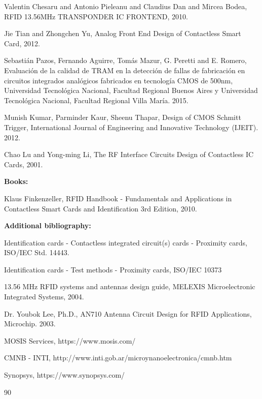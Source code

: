 \documentclass{article} %
\begin{document}
\begin{multicols}{2}
{\begin{thebibliography}{99}
	Valentin Chesaru and Antonio Pieleanu and Claudius Dan and Mircea Bodea, RFID 13.56MHz TRANSPONDER IC FRONTEND, 2010.

	Jie Tian and Zhongchen Yu, Analog Front End Design of Contactless Smart Card, 2012.

	Sebastián Pazos, Fernando Aguirre, Tomás Mazur, G. Peretti and E. Romero, Evaluación de la calidad de TRAM en la detección de fallas de fabricación en circuitos integrados analógicos fabricados en tecnología CMOS de 500nm, Universidad Tecnológica Nacional, Facultad Regional Buenos Aires y Universidad Tecnológica Nacional, Facultad Regional Villa María. 2015.

	Munish Kumar, Parminder Kaur, Sheenu Thapar, Design of CMOS Schmitt Trigger, International Journal of Engineering and Innovative Technology (IJEIT). 2012.

	Chao Lu and Yong-ming Li, The RF Interface Circuits Design of Contactless IC Cards, 2001.

\hspace{-1cm} \textbf{Books:}

	Klaus Finkenzeller, RFID Handbook - Fundamentals and Applications in Contactless Smart Cards and Identification 3rd Edition, 2010.

\hspace{-1cm} \textbf{Additional bibliography:}

	Identification cards - Contactless integrated circuit(s) cards - Proximity cards, ISO/IEC Std. 14443.

	Identification cards - Test methods - Proximity cards, ISO/IEC 10373

	13.56 MHz RFID systems and antennas design guide, MELEXIS Microelectronic Integrated Systems, 2004.

	Dr. Youbok Lee, Ph.D., AN710 Antenna Circuit Design for RFID Applications, Microchip. 2003.

	MOSIS Services, https://www.mosis.com/

	CMNB - INTI, http://www.inti.gob.ar/microynanoelectronica/cmnb.htm

	Synopsys, https://www.synopsys.com/

\end{thebibliography}{90}
\noindent

} 

\end{multicols}
\end{document}
